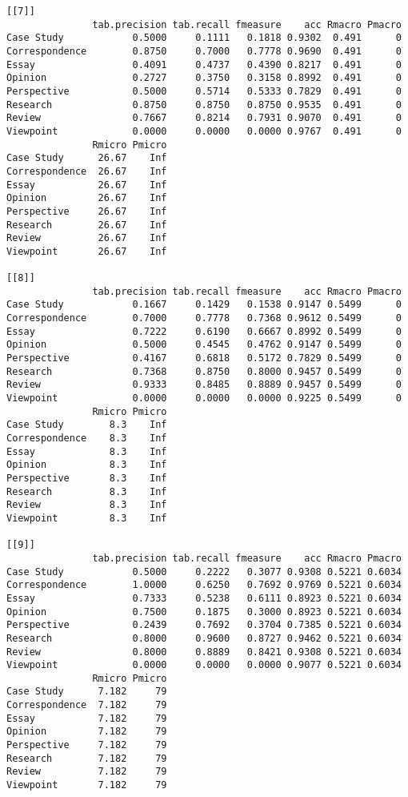 \documentclass[]{article}
\begin{document}
\begin{lstlisting}[frame=single]
[[7]]
               tab.precision tab.recall fmeasure    acc Rmacro Pmacro
Case Study            0.5000     0.1111   0.1818 0.9302  0.491      0
Correspondence        0.8750     0.7000   0.7778 0.9690  0.491      0
Essay                 0.4091     0.4737   0.4390 0.8217  0.491      0
Opinion               0.2727     0.3750   0.3158 0.8992  0.491      0
Perspective           0.5000     0.5714   0.5333 0.7829  0.491      0
Research              0.8750     0.8750   0.8750 0.9535  0.491      0
Review                0.7667     0.8214   0.7931 0.9070  0.491      0
Viewpoint             0.0000     0.0000   0.0000 0.9767  0.491      0
               Rmicro Pmicro
Case Study      26.67    Inf
Correspondence  26.67    Inf
Essay           26.67    Inf
Opinion         26.67    Inf
Perspective     26.67    Inf
Research        26.67    Inf
Review          26.67    Inf
Viewpoint       26.67    Inf

[[8]]
               tab.precision tab.recall fmeasure    acc Rmacro Pmacro
Case Study            0.1667     0.1429   0.1538 0.9147 0.5499      0
Correspondence        0.7000     0.7778   0.7368 0.9612 0.5499      0
Essay                 0.7222     0.6190   0.6667 0.8992 0.5499      0
Opinion               0.5000     0.4545   0.4762 0.9147 0.5499      0
Perspective           0.4167     0.6818   0.5172 0.7829 0.5499      0
Research              0.7368     0.8750   0.8000 0.9457 0.5499      0
Review                0.9333     0.8485   0.8889 0.9457 0.5499      0
Viewpoint             0.0000     0.0000   0.0000 0.9225 0.5499      0
               Rmicro Pmicro
Case Study        8.3    Inf
Correspondence    8.3    Inf
Essay             8.3    Inf
Opinion           8.3    Inf
Perspective       8.3    Inf
Research          8.3    Inf
Review            8.3    Inf
Viewpoint         8.3    Inf

[[9]]
               tab.precision tab.recall fmeasure    acc Rmacro Pmacro
Case Study            0.5000     0.2222   0.3077 0.9308 0.5221 0.6034
Correspondence        1.0000     0.6250   0.7692 0.9769 0.5221 0.6034
Essay                 0.7333     0.5238   0.6111 0.8923 0.5221 0.6034
Opinion               0.7500     0.1875   0.3000 0.8923 0.5221 0.6034
Perspective           0.2439     0.7692   0.3704 0.7385 0.5221 0.6034
Research              0.8000     0.9600   0.8727 0.9462 0.5221 0.6034
Review                0.8000     0.8889   0.8421 0.9308 0.5221 0.6034
Viewpoint             0.0000     0.0000   0.0000 0.9077 0.5221 0.6034
               Rmicro Pmicro
Case Study      7.182     79
Correspondence  7.182     79
Essay           7.182     79
Opinion         7.182     79
Perspective     7.182     79
Research        7.182     79
Review          7.182     79
Viewpoint       7.182     79


\end{lstlisting}
\end{document}
